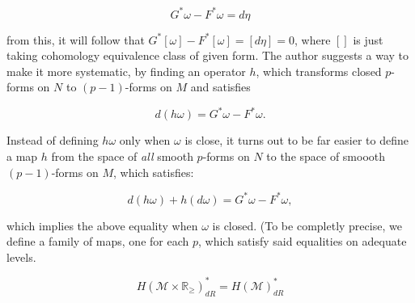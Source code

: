 \documentclass[licencjacka]{pracamgr}
\begin{document}
\[
    G^\ast \omega - F^\ast \omega = d\eta
\]

from this, it will follow that $ G^\ast [\omega] - F^\ast [\omega] =
[d\eta] = 0$, where $[]$ is just taking cohomology equivalence class
of given form. The author suggests a way to make it more systematic,
by finding an operator $h$, which transforms closed $p$-forms on $N$
to $(p-1)$-forms on $M$ and satisfies

\[
    d(h\omega) = G^\ast \omega - F^\ast \omega.
\]

Instead of defining $h\omega$ only when $\omega$ is close, it turns
out to be far easier to define a map $h$ from the space of
\textit{all} smooth $p$-forms on $N$ to the space of smoooth
$(p-1)$-forms on $M$, which satisfies:

\[
    d(h\omega) + h(d\omega) = G^\ast \omega - F^\ast \omega ,
\]

which implies the above equality when $\omega$ is closed. (To be
completly precise, we define a family of maps, one for each $p$, which
satisfy said equalities on adequate levels.

\[
    H(\mathcal{M} \times \mathbb{R}_{\geq})_{dR}^\ast = H(\mathcal{M})_{dR}^\ast
\]

\normalsize



\end{document}
